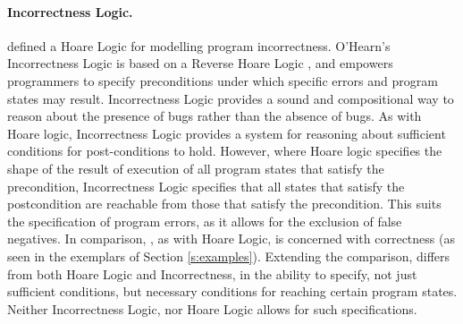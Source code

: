 {\paragraph{Incorrectness Logic.} \cite{IncorrectnessLogic} defined a Hoare
Logic for modelling program incorrectness. O'Hearn's Incorrectness Logic
is based on a Reverse Hoare Logic \cite{reverseHoare}, and empowers programmers to 
specify preconditions under which specific errors and program states may result. 
Incorrectness Logic provides a sound and compositional way to reason about 
the presence of bugs rather than the absence of bugs. 
As with Hoare logic, Incorrectness Logic provides a system
for reasoning about sufficient conditions for post-conditions to hold.
However, where Hoare logic specifies the shape of the result of execution 
of all program states that satisfy the precondition, Incorrectness Logic
specifies that all states that satisfy the postcondition are reachable
from those that satisfy the precondition. This suits the specification
of program errors, as it allows for the exclusion of false negatives.
In comparison, \Chainmail, as with Hoare Logic, is concerned with correctness
(as seen in the exemplars of Section \ref{s:examples}). 
Extending the comparison, \Chainmail differs from both Hoare Logic and Incorrectness,
in the ability to specify, not just sufficient conditions, but necessary conditions for 
reaching certain program states. Neither Incorrectness Logic, 
nor Hoare Logic allows for such specifications.



%



}
